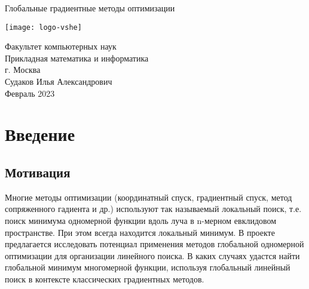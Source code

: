 \documentclass{article}
\begin{document}
    \begin{center}
        \begin{huge}
            Глобальные градиентные методы оптимизации\\
        \end{huge}

        \vspace{1.8cm}
        \texttt{[image: logo-vshe]}

        \vspace{7cm}

        Факультет компьютерных наук\\
        Прикладная математика и информатика\\
        г. Москва\\

        \vspace{1cm}
        Судаков Илья Александрович\\
        Февраль 2023\\
    \end{center}
    \newpage
    \tableofcontents




    \newpage


    \section{Введение}

    \subsection{Мотивация}
    Многие методы оптимизации (координатный спуск, градиентный спуск, метод сопряженного гадиента и др.) используют так называемый локальный поиск, т.е. поиск минимума одномерной функции вдоль луча в n-мерном евклидовом пространстве. При этом всегда находится локальный минимум. В проекте предлагается исследовать потенциал применения методов глобальной одномерной оптимизации для организации линейного поиска. В каких случаях удастся найти глобальной минимум многомерной функции, используя глобальный линейный поиск в контексте классических градиентных методов.
\end{document}
